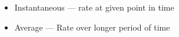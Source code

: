 \begin{itemize}
\begin{itemize}
        \begin{itemize}

          \item Instantaneous — rate at given point in time

          \item Average — Rate over longer period of time

        \end{itemize}

    \end{itemize}

\end{itemize}



